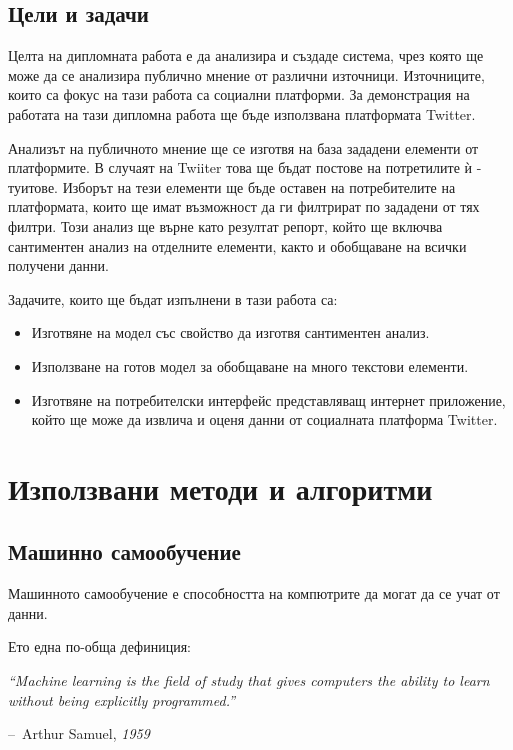 \documentclass{article}
\makeatletter
\newenvironment{chapquote}[2][2em]
{\setlength{\@tempdima}{#1}%
\def\chapquote@author{#2}%
\parshape 1 \@tempdima \dimexpr\textwidth-2\@tempdima\relax%
\itshape}
{\par\normalfont\hfill--\ \chapquote@author\hspace*{\@tempdima}\par\bigskip}
\makeatother
\begin{document}
    \subsection{Цели и задачи}

    Целта на дипломната работа е да анализира и създаде система, чрез която ще може да се анализира публично мнение от
    различни източници. Източниците, които са фокус на тази работа са социални платформи. За демонстрация на работата на
    тази дипломна работа ще бъде използвана платформата Twitter.

    Анализът на публичното мнение ще се изготвя на база зададени елементи от платформите. В случаят на Twiiter това ще
    бъдат постове на потретилите ѝ - туитове. Изборът на тези елементи ще бъде оставен на потребителите на платформата,
    които ще имат възможност да ги филтрират по зададени от тях филтри. Този анализ ще върне като резултат репорт, който ще
    включва сантиментен анализ на отделните елементи, както и обобщаване на всички получени данни.

    Задачите, които ще бъдат изпълнени в тази работа са:

    \begin{itemize}
        \item Изготвяне на модел със свойство да изготвя сантиментен анализ.
        \item Използване на готов модел за обобщаване на много текстови елементи.
        \item Изготвяне на потребителски интерфейс представляващ интернет приложение, който ще може да извлича и оценя
        данни от социалната платформа Twitter.
    \end{itemize}

    \newpage


    \section{Използвани методи и алгоритми}

    \subsection{Машинно самообучение}

    Машинното самообучение е способността на компютрите да могат да се учат от данни.

    Ето една по-обща дефиниция:

    \begin{chapquote}{Arthur Samuel, \textit{1959}}
        ``Machine learning is the field of study that gives computers the ability to learn without being
        explicitly programmed.''
    \end{chapquote}
\end{document}
